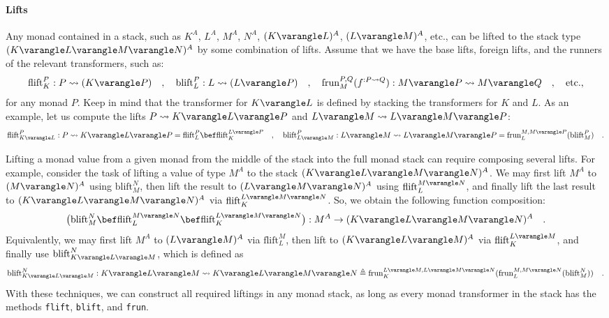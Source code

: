 \paragraph{Lifts}

Any monad contained in a stack, such as $K^{A}$, $L^{A}$, $M^{A}$,
$N^{A}$, $(K\varangle L)^{A}$, $(L\varangle M)^{A}$, etc., can
be lifted to the stack type $(K\varangle L\varangle M\varangle N)^{A}$
by some combination of lifts. Assume that we have the base lifts,
foreign lifts, and the runners of the relevant transformers, such
as:
\[
\text{flift}_{K}^{P}:P\leadsto(K\varangle P)\quad,\quad\text{blift}_{L}^{P}:L\leadsto(L\varangle P)\quad,\quad\text{frun}_{M}^{P,Q}(f^{:P\leadsto Q}):M\varangle P\leadsto M\varangle Q\quad,\quad\text{etc.,}
\]
for any monad $P$. Keep in mind that the transformer for $K\varangle L$
is defined by stacking the transformers for $K$ and $L$. As an example,
let us compute the lifts $P\leadsto K\varangle L\varangle P$ and
$L\varangle M\leadsto L\varangle M\varangle P$: 
\[
\text{flift}_{K\varangle L}^{P}:P\leadsto K\varangle L\varangle P=\text{flift}_{L}^{P}\bef\text{flift}_{K}^{L\varangle P}\quad,\quad\text{blift}_{L\varangle M}^{P}:L\varangle M\leadsto L\varangle M\varangle P=\text{frun}_{L}^{M,M\varangle P}(\text{blift}_{M}^{P})\quad.
\]

Lifting a monad value from a given monad from the middle of the stack
into the full monad stack can require composing several lifts. For
example, consider the task of lifting a value of type $M^{A}$ to
the stack $(K\varangle L\varangle M\varangle N)^{A}$. We may first
lift $M^{A}$ to $(M\varangle N)^{A}$ using $\text{blift}_{M}^{N}$,
then lift the result to $(L\varangle M\varangle N)^{A}$ using $\text{flift}_{L}^{M\varangle N}$,
and finally lift the last result to $(K\varangle L\varangle M\varangle N)^{A}$
via $\text{flift}_{K}^{L\varangle M\varangle N}$. So, we obtain the
following function composition:
\[
\big(\text{blift}_{M}^{N}\bef\text{flift}_{L}^{M\varangle N}\bef\text{flift}_{K}^{L\varangle M\varangle N}\big):M^{A}\rightarrow(K\varangle L\varangle M\varangle N)^{A}\quad.
\]
Equivalently, we may first lift $M^{A}$ to $(L\varangle M)^{A}$
via $\text{flift}_{L}^{M}$, then lift to $(K\varangle L\varangle M)^{A}$
via $\text{flift}_{K}^{L\varangle M}$, and finally use $\text{blift}_{K\varangle L\varangle M}^{N}$,
which is defined as
\[
\text{blift}_{K\varangle L\varangle M}^{N}:K\varangle L\varangle M\leadsto K\varangle L\varangle M\varangle N\triangleq\text{frun}_{K}^{L\varangle M,L\varangle M\varangle N}(\text{frun}_{L}^{M,M\varangle N}(\text{blift}_{M}^{N}))\quad.
\]
With these techniques, we can construct all required liftings in any
monad stack, as long as every monad transformer in the stack has the
methods \lstinline!flift!, \lstinline!blift!, and \lstinline!frun!.

